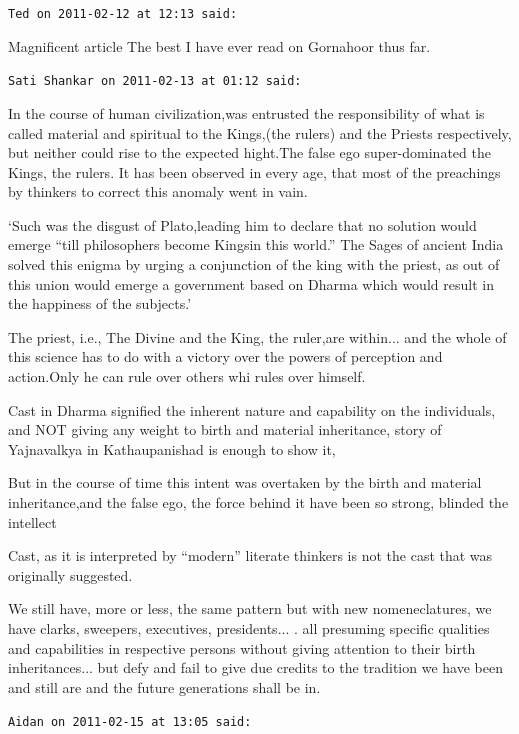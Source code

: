 \begin{footnotesize}
\begin{sffamily}
\texttt{Ted on 2011-02-12 at 12:13 said:}

Magnificent article The best I have ever read on Gornahoor thus far.

\hfill

\texttt{Sati Shankar on 2011-02-13 at 01:12 said:}

In the course of human civilization,was entrusted the responsibility of what is called material and spiritual to the Kings,(the rulers) and the Priests respectively, but neither could rise to the expected hight.The false ego super-dominated the Kings, the rulers. It has been observed in every age, that most of the preachings by thinkers to correct this anomaly went in vain.

`Such was the disgust of Plato,leading him to declare that no solution would emerge ``till philosophers become Kingsin this world.'' The Sages of ancient India solved this enigma by urging a conjunction of the king with the priest, as out of this union would emerge a government based on Dharma which would result in the happiness of the subjects.'

The priest, i.e., The Divine and the King, the ruler,are within... and the whole of this science has to do with a victory over the powers of perception and action.Only he can rule over others whi rules over himself.

Cast in Dharma signified the inherent nature and capability on the individuals, and NOT giving any weight to birth and material inheritance, story of Yajnavalkya in Kathaupanishad is enough to show it,

But in the course of time this intent was overtaken by the birth and material inheritance,and the false ego, the force behind it have been so strong, blinded the intellect

Cast, as it is interpreted by ``modern'' literate thinkers is not the cast that was originally suggested.

We still have, more or less, the same pattern but with new nomeneclatures, we have clarks, sweepers, executives, presidents... . all presuming specific qualities and capabilities in respective persons without giving attention to their birth inheritances... but defy and fail to give due credits to the tradition we have been and still are and the future generations shall be in.

\hfill

\texttt{Aidan on 2011-02-15 at 13:05 said:}


\end{sffamily}
\end{footnotesize}
